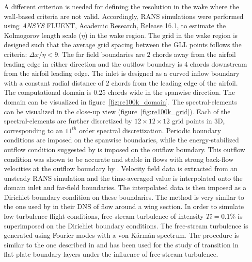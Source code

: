 A different criterion is needed for defining the resolution in the wake where the wall-based criteria are not valid. Accordingly, RANS simulations were performed using \textit{ANSYS}\textsuperscript{\textregistered} FLUENT, Academic Research, Release 16.1, to estimate the Kolmogorov length scale ($\eta$) in the wake region. The grid in the wake region is designed such that the average grid spacing between the GLL points follows the criteria: $\Delta x/\eta < 9$. The far field boundaries are $2$ chords away from the airfoil leading edge in either direction and the outflow boundary is $4$ chords downstream from the airfoil leading edge. The inlet is designed as a curved inflow boundary with a constant radial distance of $2$ chords from the leading edge of the airfoil. The computational domain is $0.25$ chords wide in the spanwise direction. The domain can be visualized in figure~\ref{fig:re100k_domain}. The spectral-elements can be visualized in the close-up view (figure~\ref{fig:re100k_grid}). Each of the spectral-elements are further discretized by $12\times12\times12$ grid points in 3D, corresponding to an $11^{th}$ order spectral discretization. Periodic boundary conditions are imposed on the spanwise boundaries, while the energy-stabilized outflow condition suggested by \cite{dong2014} is imposed on the outflow boundary. This outflow condition was shown to be accurate and stable in flows with strong back-flow velocities at the outflow boundary by \cite{dong2014}. Velocity field data is extracted from an unsteady RANS simulation and the time-averaged value is interpolated onto the domain inlet and far-field boundaries. The interpolated data is then imposed as a Dirichlet boundary condition on these boundaries. The method is very similar to the one used by \cite{hosseini16} in their DNS of flow around a wing section. In order to simulate low turbulence flight conditions, free-stream turbulence of intensity $Ti=0.1\%$ is superimposed on the Dirichlet boundary conditions. The free-stream turbulence is generated using Fourier modes with a von K\'arm\'an spectrum. The procedure is similar to the one described in \cite{brandt04} and has been used for the study of transition in flat plate boundary layers under the influence of free-stream turbulence.

